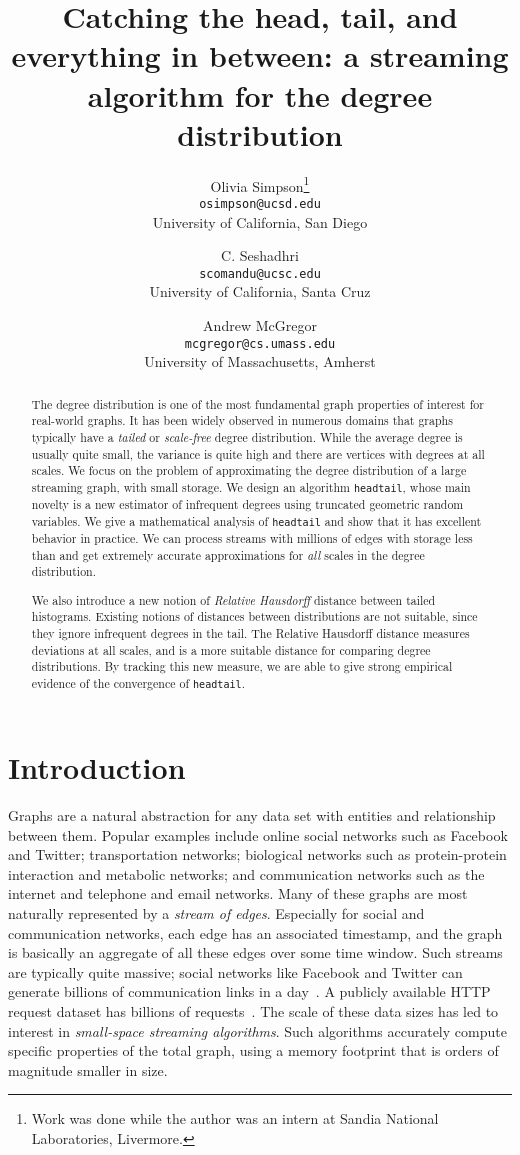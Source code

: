 \documentclass[11pt]{article}
\author{Olivia Simpson\thanks{Work was done while the author
was an intern at Sandia National Laboratories, Livermore.}
\\ {\tt osimpson@ucsd.edu}\\
University of California, San Diego
\and C. Seshadhri
 \\ {\tt scomandu@ucsc.edu}\\
University of California, Santa Cruz
\and Andrew McGregor
\\ {\tt mcgregor@cs.umass.edu}\\
University of Massachusetts, Amherst
}
\title{Catching the head, tail, and everything in between: a streaming algorithm for the degree distribution}
\date{}
\theoremstyle{definition}
\newcommand{\degdist}{{\tt headtail}}
\begin{document}
\maketitle

\begin{abstract}
The degree distribution is one of the most fundamental graph properties of interest
for real-world graphs. It has been widely observed in numerous domains that graphs
typically have a \emph{tailed} or \emph{scale-free} degree distribution. While the average
degree is usually quite small, the variance is quite high and there are vertices
with degrees at all scales. We focus on the problem of approximating the degree distribution
of a large streaming graph, with small storage. We design an algorithm \degdist{}, whose main novelty
is a new estimator of infrequent degrees using truncated geometric random
variables. We give a mathematical analysis of \degdist{}
and show that it has excellent behavior in practice. We can process streams with millions
of edges with storage less than  and get extremely accurate approximations
for \emph{all} scales in the degree distribution.

We also introduce a new notion of \emph{Relative Hausdorff} distance between tailed
histograms. Existing notions of distances between distributions are not suitable, since they ignore
infrequent degrees in the tail. The Relative Hausdorff distance measures deviations at all scales,
and is a more suitable distance for comparing degree distributions. By tracking this new measure,
we are able to give strong empirical evidence of the convergence of \degdist.
\end{abstract}

\section{Introduction}

Graphs are a natural abstraction for any data set with entities and relationship between them. Popular examples include online social networks such as Facebook and Twitter;  transportation networks; biological networks such as protein-protein interaction and metabolic networks; and communication networks such as the internet and telephone and email networks.
Many of these graphs are most naturally represented by
a \emph{stream of edges}. Especially for social and communication networks, each edge has an associated timestamp, and the graph
is basically an aggregate of all these edges over some time window.
Such streams are typically quite massive; social networks like Facebook and Twitter can generate billions of communication links in a day~\cite{KwLe10,FB}.
A publicly available HTTP request dataset has billions of requests~\cite{Meiss08WSDM}. The scale of these data sizes has led
to interest in \emph{small-space streaming algorithms}. Such algorithms accurately compute specific properties
of the total graph, using a memory footprint that is orders of magnitude smaller in size.
\end{document}
